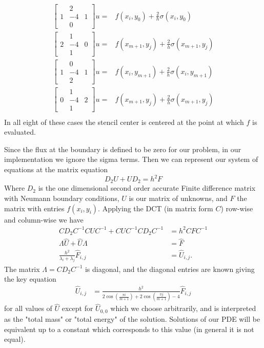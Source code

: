 \documentclass[12pt]{article}
\begin{document}
\begin{align*}
\begin{bmatrix}&2&\\1&-4&1\\&0&\end{bmatrix}u =& f(x_i,y_0) + \frac{2}{h} \sigma(x_i, y_0) \tag{Southern} \\
\begin{bmatrix}&1&\\2&-4&0\\&1&\end{bmatrix}u =& f(x_{m+1},y_j) + \frac{2}{h} \sigma(x_{m+1}, y_j) \tag{Eastern} \\
\begin{bmatrix}&0&\\1&-4&1\\&2&\end{bmatrix}u =& f(x_i,y_{m+1}) + \frac{2}{h} \sigma(x_i, y_{m+1}) \tag{Northern} \\
\begin{bmatrix}&1&\\0&-4&2\\&1&\end{bmatrix}u =& f(x_{m+1},y_j) + \frac{2}{h} \sigma(x_{m+1}, y_j) \tag{Western} \\
\end{align*}
In all eight of these cases the stencil center is centered at the point at which $f$ is evaluated. \bigbreak

Since the flux at the boundary is defined to be zero for our problem, in our implementation we ignore the sigma terms. Then we can represent our system of equations at the matrix equation
$$
D_2U + U D_2 = h^2F
$$
Where $D_2$ is the one dimensional second order accurate Finite difference matrix with Neumann boundary conditions, $U$ is our matrix of unknowns, and $F$ the matrix with entries $f(x_i,y_i)$. Applying the DCT (in matrix form $C$) row-wise and column-wise we have
\begin{align*}
CD_2 C^{-1} CUC^{-1} + CUC^{-1} CD_2C^{-1} &= h^2C F C^{-1} \\
\Lambda \hat{U} + \hat{U} \Lambda &= \hat{F} \\
\frac{h^2}{\lambda_{i} + \lambda_{j}} \hat{F}_{i,j} &= \hat{U}_{i,j}.
\end{align*}
The matrix $\Lambda = CD_2C^{-1}$ is diagonal, and the diagonal entries are known giving the key equation
\begin{align}
\hat{U}_{i,j} &= \frac{h^2}{2\cos(\frac{\pi i}{m+1}) + 2\cos(\frac{\pi j}{m+1})-4}\hat{F}_{i,j} \label{keyEquation}
\end{align}
for all values of $\hat{U}$ except for $\hat{U}_{0,0}$ which we choose arbitrarily, and is interpreted as the "total mass" or "total energy" of the solution. Solutions of our PDE will be equivalent up to a constant which corresponds to this value (in general it is not equal). \bigbreak
\end{document}

